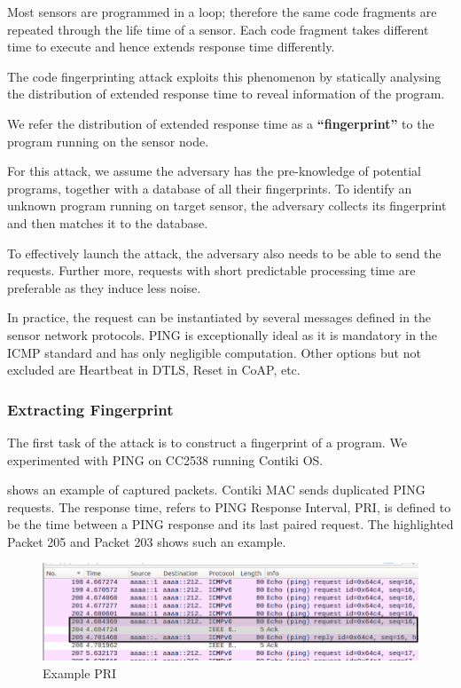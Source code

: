 Most sensors are programmed in a loop; therefore the same code fragments are repeated through the life time of a sensor. Each code fragment takes different time to execute and hence extends response time differently. 

The code fingerprinting attack exploits this phenomenon by statically analysing the distribution of extended response time to reveal information of the program.

\begin{definition}
	We refer the distribution of extended response time as a \textbf{``fingerprint''} to the program running on the sensor node.
\end{definition}

For this attack, we assume the adversary has the pre-knowledge of potential programs, together with a database of all their fingerprints. To identify an unknown program running on target sensor, the adversary collects its fingerprint and then matches it to the database.

To effectively launch the attack, the adversary also needs to be able to send the requests. Further more, requests with short predictable processing time are preferable as they induce less noise. 

In practice, the request can be instantiated by several messages defined in the sensor network protocols. PING is exceptionally ideal as it is mandatory in the ICMP standard\cite{rfc4433} and has only negligible computation. Other options but not excluded are Heartbeat in DTLS\cite{rfc6520}, Reset in CoAP\cite{rfc7252}, etc.

\subsubsection{Extracting Fingerprint}
The first task of the attack is to construct a fingerprint of a program. We experimented with PING on CC2538 running Contiki OS. 

 shows an example of captured packets. Contiki MAC\cite{ContikiMAC} sends duplicated PING requests. The response time, refers to PING Response Interval, PRI, is defined to be the time between a PING response and its last paired request. The highlighted Packet 205 and Packet 203 shows such an example.

\begin{figure}[!h]
	\centering
	\includegraphics[width=\textwidth]{fig/PRI_hl.png}
	\caption{Example PRI\label{ExamplePri}}
\end{figure}

